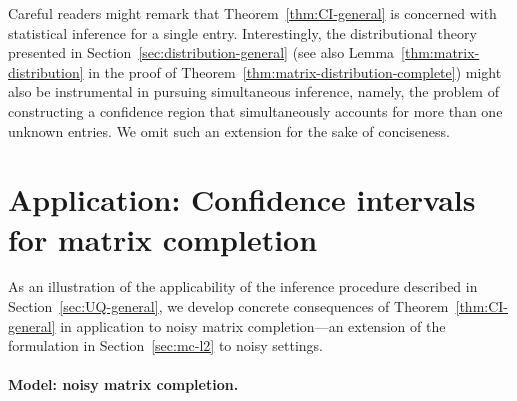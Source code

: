 Careful readers might remark that Theorem~\ref{thm:CI-general} is concerned with statistical inference for a single entry. 
Interestingly, the distributional theory presented in Section~\ref{sec:distribution-general} (see also Lemma~\ref{thm:matrix-distribution} in the proof of Theorem~\ref{thm:matrix-distribution-complete}) might also be instrumental in pursuing simultaneous inference, namely, the problem of constructing a confidence region that simultaneously accounts for more than one unknown entries. We omit such an extension for the sake of conciseness. 


%




%



\section{Application: Confidence intervals for matrix completion}
\label{sec:CI-matrix-completion}

As an illustration of the applicability of the inference procedure described in Section~\ref{sec:UQ-general}, 
we develop concrete consequences of Theorem~\ref{thm:CI-general} in application to noisy matrix completion---an extension of the formulation
in Section~\ref{sec:mc-l2} to noisy settings. 


\paragraph{Model: noisy matrix completion.} 

